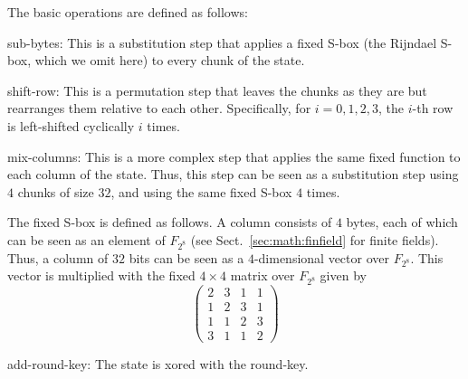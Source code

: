 The basic operations are defined as follows:
\begin{compactenum}
  \item sub-bytes: This is a substitution step that applies a fixed S-box (the Rijndael S-box, which we omit here) to every chunk of the state.
  \item shift-row: This is a permutation step that leaves the chunks as they are but rearranges them relative to each other.
    Specifically, for $i=0,1,2,3$, the $i$-th row is left-shifted cyclically $i$ times.
  \item mix-columns: This is a more complex step that applies the same fixed function to each column of the state.
    Thus, this step can be seen as a substitution step using $4$ chunks of size $32$, and using the same fixed S-box $4$ times.
    
    The fixed S-box is defined as follows.
    A column consists of $4$ bytes, each of which can be seen as an element of $F_{2^8}$ (see Sect.~\ref{sec:math:finfield} for finite fields).
    Thus, a column of $32$ bits can be seen as a $4$-dimensional vector over $F_{2^8}$.
    This vector is multiplied with the fixed $4\times 4$ matrix over $F_{2^8}$ given by
    \[\left(\begin{matrix}
    2&3&1&1\\1&2&3&1\\1&1&2&3\\3&1&1&2
   \end{matrix}\right)\]
  \item add-round-key: The state is xored with the round-key.   
\end{compactenum}